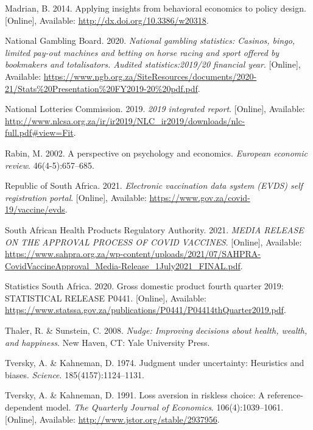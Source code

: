 \documentclass[11pt,preprint, authoryear]{elsarticle}
\numberwithin{equation}{section}
\numberwithin{figure}{section}
\numberwithin{table}{section}
\newlength{\cslhangindent}
\newenvironment{CSLReferences}%
  {\setlength{\parindent}{0pt}%
  \everypar{\setlength{\hangindent}{\cslhangindent}}\ignorespaces}%
  {\par}
\begin{document}
\begin{CSLReferences}{1}{0}
\leavevmode\hypertarget{ref-flu}{}%
Madrian, B. 2014. Applying insights from behavioral economics to policy
design. {[}Online{]}, Available: \url{http://dx.doi.org/10.3386/w20318}.

\leavevmode\hypertarget{ref-gamble}{}%
National Gambling Board. 2020. \emph{National gambling statistics:
Casinos, bingo, limited pay-out machines and betting on horse racing and
sport offered by bookmakers and totalisators. Audited statistics:2019/20
financial year}. {[}Online{]}, Available:
\url{https://www.ngb.org.za/SiteResources/documents/2020-21/Stats\%20Presentation\%20FY2019-20\%20pdf.pdf}.

\leavevmode\hypertarget{ref-lotto}{}%
National Lotteries Commission. 2019. \emph{2019 integrated report}.
{[}Online{]}, Available:
\url{http://www.nlcsa.org.za/ir/ir2019/NLC_ir2019/downloads/nlc-full.pdf\#view=Fit}.

\leavevmode\hypertarget{ref-rabin}{}%
Rabin, M. 2002. A perspective on psychology and economics.
\emph{European economic review}. 46(4-5):657--685.

\leavevmode\hypertarget{ref-evds}{}%
Republic of South Africa. 2021. \emph{Electronic vaccination data system
(EVDS) self registration portal}. {[}Online{]}, Available:
\url{https://www.gov.za/covid-19/vaccine/evds}.

\leavevmode\hypertarget{ref-sah}{}%
South African Health Products Regulatory Authority. 2021. \emph{MEDIA
RELEASE ON THE APPROVAL PROCESS OF COVID VACCINES}. {[}Online{]},
Available:
\url{https://www.sahpra.org.za/wp-content/uploads/2021/07/SAHPRA-CovidVaccineApproval_Media-Release_1July2021_FINAL.pdf}.

\leavevmode\hypertarget{ref-statsa}{}%
Statistics South Africa. 2020. Gross domestic product fourth quarter
2019: STATISTICAL RELEASE P0441. {[}Online{]}, Available:
\url{https://www.statssa.gov.za/publications/P0441/P04414thQuarter2019.pdf}.

\leavevmode\hypertarget{ref-nudge}{}%
Thaler, R. \& Sunstein, C. 2008. \emph{Nudge: Improving decisions about
health, wealth, and happiness.} New Haven, CT: Yale University Press.

\leavevmode\hypertarget{ref-khan}{}%
Tversky, A. \& Kahneman, D. 1974. Judgment under uncertainty: Heuristics
and biases. \emph{Science}. 185(4157):1124--1131.

\leavevmode\hypertarget{ref-ref}{}%
Tversky, A. \& Kahneman, D. 1991. Loss aversion in riskless choice: A
reference-dependent model. \emph{The Quarterly Journal of Economics}.
106(4):1039--1061. {[}Online{]}, Available:
\url{http://www.jstor.org/stable/2937956}.


\end{CSLReferences}
\end{document}
